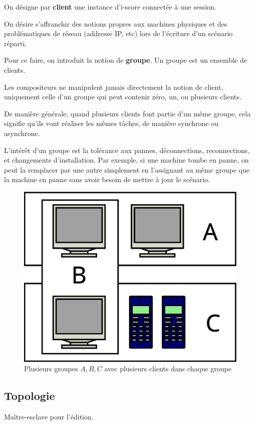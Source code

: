 \documentclass{article}
\newcommand\vocab[1]{\textbf{#1}}
\begin{document}
On désigne par \vocab{client} une instance d'i-score connectée à une session.

On désire s'affranchir des notions propres aux machines physiques et des problématiques de réseau (addresse IP, etc) lors de l'écriture 
d'un scénario réparti. 

Pour ce faire, on introduit la notion de \vocab{groupe}. 
Un groupe est un ensemble de clients.

Les compositeurs ne manipulent jamais directement la notion de client, uniquement celle d'un groupe qui peut contenir zéro, un, ou plusieurs clients.

De manière générale, quand plusieurs clients font partie d'un même groupe, cela signifie qu'ils vont réaliser les mêmes tâches, de manière synchrone ou asynchrone.

L'intérêt d'un groupe est la tolérance aux pannes, déconnections, reconnections, et changements d'installation. 
Par exemple, si une machine tombe en panne, on peut la remplacer par une autre simplement en l'assignant au même groupe que la machine en panne 
sans avoir besoin de mettre à jour le scénario.


\begin{figure}[h]
	\centering
	\includegraphics[scale=0.2]{images/groupes.eps}
	\caption{Plusieurs groupes $A,B,C$ avec plusieurs clients dans chaque groupe}
	\label{img.groupes}
\end{figure}


\subsection{Topologie}
Maître-esclave pour l'édition.
\end{document}
